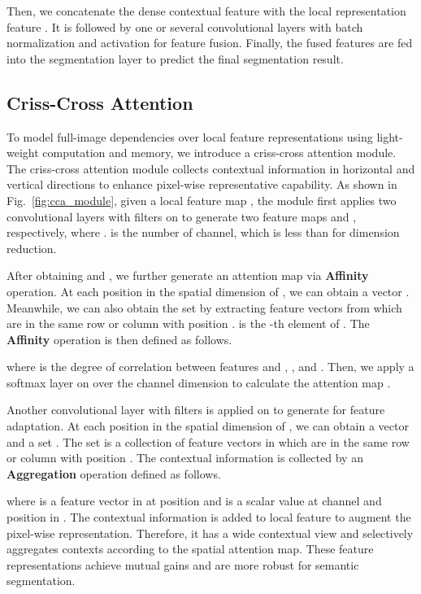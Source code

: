 \documentclass[10pt,journal,compsoc]{IEEEtran}
\begin{document}
Then, we concatenate the dense contextual feature  with the local representation feature . It is followed by one or several convolutional layers with batch normalization and activation for feature fusion. Finally, the fused features are fed into the segmentation layer to predict the final segmentation result.


\subsection{Criss-Cross Attention} 
To model full-image dependencies over local feature representations using light-weight computation and memory, we introduce a criss-cross attention module. The criss-cross attention module collects contextual information in horizontal and vertical directions to enhance pixel-wise representative capability. As shown in Fig.~\ref{fig:cca_module}, given a local feature map , the module first applies two convolutional layers with  filters on  to generate two feature maps  and , respectively, 
where .  is the number of channel, which is less than  for dimension reduction.

After obtaining  and , we further generate an attention map  via \textbf{Affinity} operation. At each position  in the spatial dimension of , we can obtain a vector . Meanwhile, we can also obtain the set  by extracting feature vectors from  which are in the same row or column with position .  is the -th element of .
The \textbf{Affinity} operation is then defined as follows.

where  is the degree of correlation between features  and , , and . Then, we apply a softmax layer on  over the channel dimension to calculate the attention map .

Another convolutional layer with  filters is applied on  to generate  for feature adaptation. At each position  in the spatial dimension of , we can obtain a vector  and a set . The set  is a collection of feature vectors in   which are in the same row or column with position . The contextual information is collected by an \textbf{Aggregation} operation defined as follows.

where  is a feature vector in  at position  and  is a scalar value at channel  and position  in . The contextual information is added to local feature  to augment the pixel-wise representation. Therefore, it has a wide contextual view and selectively aggregates contexts according to the spatial attention map. These feature representations achieve mutual gains and are
more robust for semantic segmentation.
\end{document}
